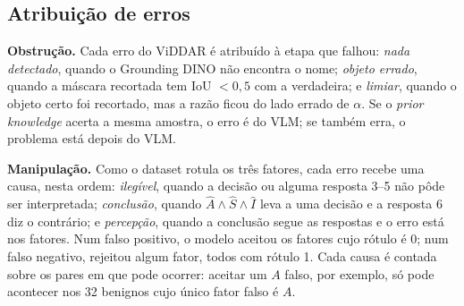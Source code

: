 \documentclass[conference]{IEEEtran}
\begin{document}
\subsection{Atribuição de erros}
\label{sec:atrib}
\textbf{Obstrução.} Cada erro do ViDDAR é atribuído à etapa que falhou: \emph{nada detectado}, quando o
Grounding DINO não encontra o nome; \emph{objeto errado}, quando a máscara recortada tem IoU $<0{,}5$ com
a verdadeira; e \emph{limiar}, quando o objeto certo foi recortado, mas a razão ficou do lado errado de
$\alpha$. Se o \emph{prior knowledge} acerta a mesma amostra, o erro é do VLM; se também erra, o
problema está depois do VLM.

\textbf{Manipulação.} Como o dataset rotula os três fatores, cada erro recebe uma causa, nesta ordem:
\emph{ilegível}, quando a decisão ou alguma resposta 3--5 não pôde ser interpretada; \emph{conclusão},
quando $\hat A\wedge\hat S\wedge\hat I$ leva a uma decisão e a resposta 6 diz o contrário; e
\emph{percepção}, quando a conclusão segue as respostas e o erro está nos fatores. Num falso positivo, o
modelo aceitou os fatores cujo rótulo é 0; num falso negativo, rejeitou algum fator, todos com rótulo 1.
Cada causa é contada sobre os pares em que pode ocorrer: aceitar um $A$ falso, por exemplo, só pode
acontecer nos 32 benignos cujo único fator falso é $A$.
\end{document}
